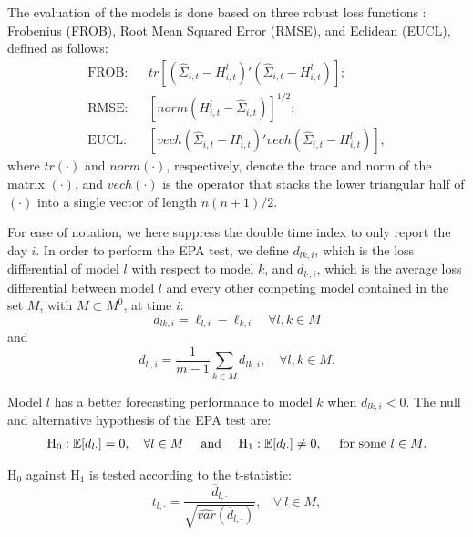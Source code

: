 The evaluation of the models is done based on three robust loss functions \citep{laurent2013loss}: Frobenius (FROB), Root Mean Squared Error (RMSE), and Eclidean (EUCL), defined as follows:
\begin{eqnarray}
\text{FROB:} & & tr[(\widehat{\Sigma}_{i,t}-H^l_{i,t})' (\widehat{\Sigma}_{i,t}-H^l_{i,t}) ]; \label{eq:frob}\\
\text{RMSE:}	&&[norm(H^l_{i,t}-\widehat{\Sigma}_{i,t})]^{1/2};\\
\text{EUCL:} &&[vech(\widehat{\Sigma}_{i,t}-H^l_{i,t})' vech (\widehat{\Sigma}_{i,t}-H^l_{i,t})] \label{eq:EUCL},
\end{eqnarray}
{where $tr(\cdot)$ and $norm(\cdot)$, respectively, denote the trace and norm of the matrix $(\cdot)$, and $vech(\cdot)$ is the operator that stacks the lower triangular half of $(\cdot)$ into a single vector of length $n(n+1)/2$.}

{For ease of notation, we here suppress the double time index to only report the day $i$.} In order to perform the EPA test, we define $d_{lk, i}$, which is the loss differential of model $l$ with respect to model $k$, and $d_{l \cdot, i}$, which is the average loss differential between model $l$ and every other competing model contained in the set $M$, {with $M \subset M^0$}, at time $i$:
\begin{equation}\label{djkt}
	d_{lk,i} = \ell_{l,i} - \ell_{k,i} \quad \forall  l,k \in M
\end{equation} and
\begin{equation}\label{dk.t}
	d_{l \cdot,i} = \frac{1}{m-1} \sum_{k \in M} d_{lk,i}, \quad  \forall  l,k \in M.
\end{equation}

Model $l$ {has a better forecasting performance} to model $k$ when $d_{lk,i} < 0$. The null and alternative hypothesis of the EPA test are:
\begin{equation}\label{null}
	\begin{array}{rl}
		\textnormal{H}_0 : \mathbb{E}[d_{l \cdot}] = 0, \quad  \forall  l \in M \ \ \ \ \textnormal{and}  \ \ \ \
		\textnormal{H}_1 : \mathbb{E}[d_{l \cdot}] \not= 0, \ \ \ \ \textnormal{for some}  \  l \in M.
	\end{array}
\end{equation}

H$_0$ against H$_1$ %
is tested according to the \cite{Hansen:Lunde:Nason:2011} t-statistic:
\begin{equation}\label{i.}
	t_{l, \cdot} = \frac{\overline{d}_{l, \cdot}}{\sqrt{\widehat{var}( \overline{d}_{l, \cdot})}}, \ \ \ \ \forall \  l\in M,
\end{equation}


